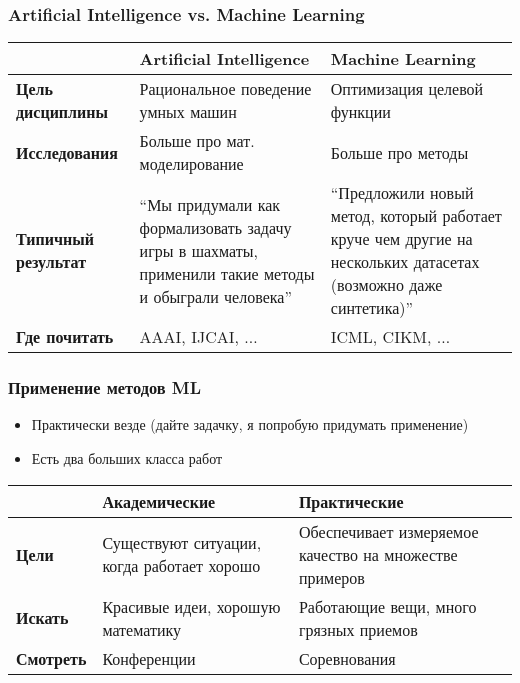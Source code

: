 \documentclass[14pt, fleqn, xcolor={dvipsnames, table}]{beamer}
\begin{document}
\begin{frame}
\frametitle{Artificial Intelligence vs. Machine Learning}
\begin{center}
\footnotesize
\begin{tabular}{p{}|p{}|p{}}
\rowcolor{Blue!20}
& \small Artificial Intelligence & \small Machine Learning \\
\hline 
\bf Цель дисциплины & Рациональное поведение умных машин & Оптимизация целевой функции \\		
\bf Исследования & Больше про мат. моделирование & Больше про методы \\
\bf Типичный результат & ``Мы придумали как формализовать задачу игры в шахматы, применили такие методы и обыграли человека'' & ``Предложили новый метод, который работает круче чем другие на нескольких датасетах (возможно даже синтетика)'' \\
\bf Где почитать & AAAI, IJCAI, $\ldots$ & ICML, CIKM, $\ldots$ \\
\end{tabular}
\end{center}
\end{frame}

\begin{frame}
\frametitle{Применение методов ML}
\begin{itemize}
\item Практически везде (дайте задачку, я попробую придумать применение)
\item Есть два больших класса работ
\end{itemize}
\begin{center}
\footnotesize
\begin{tabular}{p{}|p{}|p{}}
\rowcolor{Blue!20}
& \small Академические & \small Практические \\
\hline 
\bf Цели & Существуют ситуации, когда работает хорошо & Обеспечивает измеряемое качество на множестве примеров \\
\bf Искать & Красивые идеи, хорошую математику & Работающие вещи, много грязных приемов \\
\bf Смотреть & Конференции & Соревнования \\
\end{tabular}
\end{center}
\end{frame}
\end{document}

